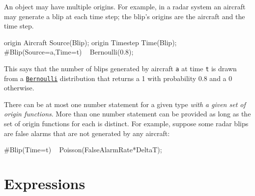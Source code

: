 \documentclass[12pt]{article}
\begin{document}
An object may have multiple origins. For example, in a radar system an aircraft may generate a blip at each time step; the blip's origins are the aircraft and the time step.
\begin{blogcode}
origin Aircraft Source(Blip);
origin Timestep Time(Blip);
#Blip(Source=a,Time=t) ~ Bernoulli(0.8);
\end{blogcode}
This says that the number of blips generated by aircraft {\tt a} at time {\tt t} is drawn from
a \hyperref[builtin-distribution-appendix]{{\tt Bernoulli}} distribution that returns a 1 with probability 0.8 and a 0 otherwise.

There can be at most one number statement for a given type {\em with a given set of origin functions}. More than one number statement
can be provided as long as the set of origin functions for each is distinct. For example, suppose some radar blips are false alarms
that are not generated by any aircraft:
\begin{blogcode}
#Blip(Time=t) ~ Poisson(FalseAlarmRate*DeltaT);
\end{blogcode}

\section{Expressions}\label{expression-section}
\end{document}
